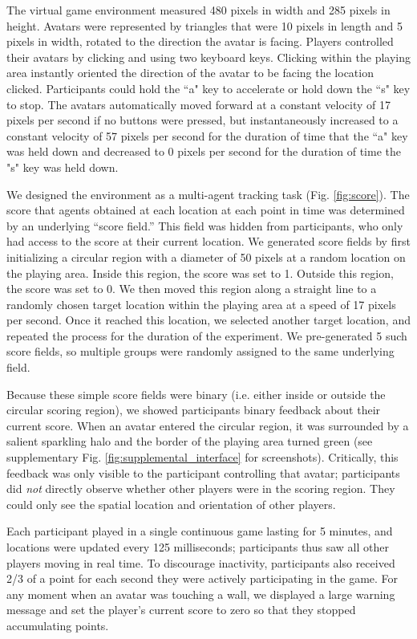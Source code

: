 \documentclass[12pt,letterpaper]{article}
\begin{document}
The virtual game environment measured 480 pixels in width and 285 pixels in height.
Avatars were represented by triangles that were 10 pixels in length and 5 pixels in width, rotated to the direction the avatar is facing. 
Players controlled their avatars by clicking and using two keyboard keys. 
Clicking within the playing area instantly oriented the direction of the avatar to be facing the location clicked. 
Participants could hold the ``a" key to accelerate or hold down the ``s" key to stop.  
The avatars automatically moved forward at a constant velocity of 17 pixels per second if no buttons were pressed, but instantaneously increased to a constant velocity of 57 pixels per second for the duration of time that the ``a" key was held down and decreased to 0 pixels per second for the duration of time the "s" key was held down. 

We designed the environment as a multi-agent tracking task (Fig. \ref{fig:score}).
The score that agents obtained at each location at each point in time was determined by an underlying ``score field.'' 
This field was hidden from participants, who only had access to the score at their current location. 
We generated score fields by first initializing a circular region with a diameter of 50 pixels at a random location on the playing area. 
Inside this region, the score was set to 1.
Outside this region, the score was set to 0.
We then moved this region along a straight line to a randomly chosen target location within the playing area at a speed of 17 pixels per second.
Once it reached this location, we selected another target location, and repeated the process for the duration of the experiment.
We pre-generated 5 such score fields, so multiple groups were randomly assigned to the same underlying field.  

Because these simple score fields were binary (i.e. either inside or outside the circular scoring region), we showed participants binary feedback about their current score.
When an avatar entered the circular region, it was surrounded by a salient sparkling halo and the border of the playing area turned green (see supplementary Fig. \ref{fig:supplemental_interface} for screenshots). 
Critically, this feedback was only visible to the participant controlling that avatar; participants did \emph{not} directly observe whether other players were in the scoring region. 
They could only see the spatial location and orientation of other players.

Each participant played in a single continuous game lasting for 5 minutes, and locations were updated every 125 milliseconds; participants thus saw all other players moving in real time. 
To discourage inactivity, participants also received 2/3 of a point for each second they were actively participating in the game.
For any moment when an avatar was touching a wall, we displayed a large warning message and set the player's current score to zero so that they stopped accumulating points.
\end{document}
